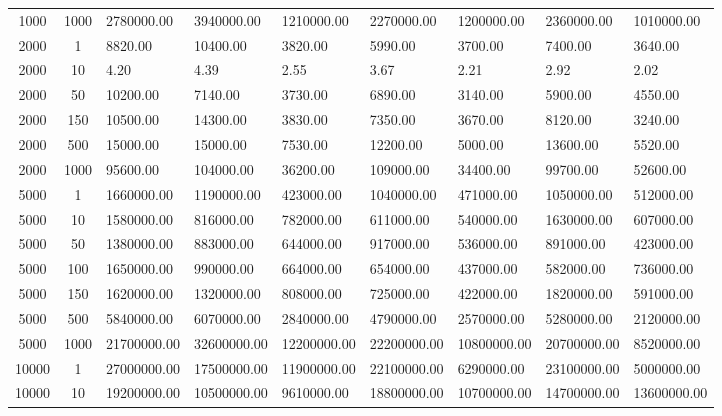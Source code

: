 \begin{table*}
\begin{center}
\begin{tabular}{cc|lllllll}
1000  & 1000 & 2780000.00    & 3940000.00    & 1210000.00   & 2270000.00    & 1200000.00   & 2360000.00   & 1010000.00   \\
2000  & 1    & 8820.00       & 10400.00      & 3820.00      & 5990.00       & 3700.00      & 7400.00      & 3640.00      \\
2000  & 10   & 4.20          & 4.39          & 2.55         & 3.67          & 2.21         & 2.92         & 2.02         \\
2000  & 50   & 10200.00      & 7140.00       & 3730.00      & 6890.00       & 3140.00      & 5900.00      & 4550.00      \\
2000  & 150  & 10500.00      & 14300.00      & 3830.00      & 7350.00       & 3670.00      & 8120.00      & 3240.00      \\
2000  & 500  & 15000.00      & 15000.00      & 7530.00      & 12200.00      & 5000.00      & 13600.00     & 5520.00      \\
2000  & 1000 & 95600.00      & 104000.00     & 36200.00     & 109000.00     & 34400.00     & 99700.00     & 52600.00     \\
5000  & 1    & 1660000.00    & 1190000.00    & 423000.00    & 1040000.00    & 471000.00    & 1050000.00   & 512000.00    \\
5000  & 10   & 1580000.00    & 816000.00     & 782000.00    & 611000.00     & 540000.00    & 1630000.00   & 607000.00    \\
5000  & 50   & 1380000.00    & 883000.00     & 644000.00    & 917000.00     & 536000.00    & 891000.00    & 423000.00    \\
5000  & 100  & 1650000.00    & 990000.00     & 664000.00    & 654000.00     & 437000.00    & 582000.00    & 736000.00    \\
5000  & 150  & 1620000.00    & 1320000.00    & 808000.00    & 725000.00     & 422000.00    & 1820000.00   & 591000.00    \\
5000  & 500  & 5840000.00    & 6070000.00    & 2840000.00   & 4790000.00    & 2570000.00   & 5280000.00   & 2120000.00   \\
5000  & 1000 & 21700000.00   & 32600000.00   & 12200000.00  & 22200000.00   & 10800000.00  & 20700000.00  & 8520000.00   \\
10000 & 1    & 27000000.00   & 17500000.00   & 11900000.00  & 22100000.00   & 6290000.00   & 23100000.00  & 5000000.00   \\
10000 & 10   & 19200000.00   & 10500000.00   & 9610000.00   & 18800000.00   & 10700000.00  & 14700000.00  & 13600000.00  \\

\end{tabular}
\end{center}
\end{table*}
